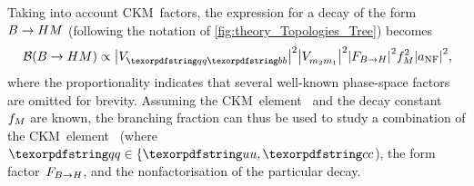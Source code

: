 Taking into account CKM~factors, the expression for a decay of the form~\({B \to HM}\) (following the notation of \cref{fig:theory_Topologies_Tree}) becomes
%
\begin{equation} \label{eqn:theory_BF}
    \BF(\decay{\PB}{\PH\PM}) \propto \abs{\V{\quark\bquark}}^{2} \abs{\V{\Pm_{2}\Pm_{1}}}^{2} \abs{F_{\decay{\PB}{\PH}}}^{2} f_{\PM}^{2} \abs{\aNF}^{2} \rlap{,}
\end{equation}
%
where the proportionality indicates that several well-known phase-space factors are omitted for brevity.
Assuming the CKM~element~ and the decay constant~\(f_{M}\) are known, the branching fraction can thus be used to study a combination of the CKM~element~\V{\quark\bquark} (where \({\quark \in \{\uquark, \cquark}\)), the form factor~\(F_{{B \to H}}\), and the nonfactorisation of the particular decay.

